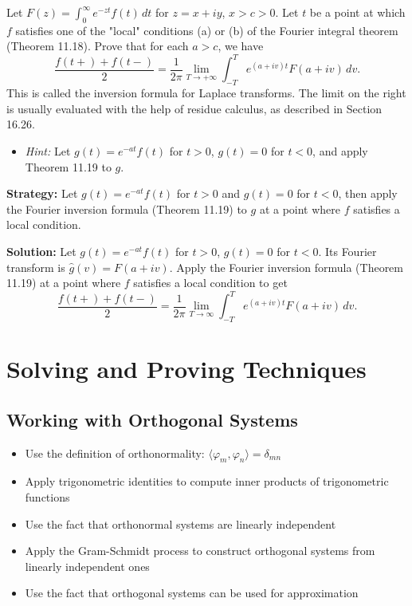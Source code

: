 \begin{problembox}
Let $F(z) = \int_0^\infty e^{-zt} f(t) \, dt$ for $z = x + iy$, $x > c > 0$. Let $t$ be a point at which $f$ satisfies one of the "local" conditions (a) or (b) of the Fourier integral theorem (Theorem 11.18). Prove that for each $a > c$, we have
\[
\frac{f(t+) + f(t-)}{2} = \frac{1}{2\pi} \lim_{T \to +\infty} \int_{-T}^T e^{(a + iv)t} F(a + iv) \, dv.
\]
This is called the inversion formula for Laplace transforms. The limit on the right is usually evaluated with the help of residue calculus, as described in Section 16.26.
\begin{itemize}
\item \textit{Hint:} Let $g(t) = e^{-at} f(t)$ for $t > 0$, $g(t) = 0$ for $t < 0$, and apply Theorem 11.19 to $g$.
\end{itemize}
\end{problembox}

\noindent\textbf{Strategy:} Let $g(t)=e^{-at}f(t)$ for $t>0$ and $g(t)=0$ for $t<0$, then apply the Fourier inversion formula (Theorem 11.19) to $g$ at a point where $f$ satisfies a local condition.

\bigskip\noindent\textbf{Solution:}
Let $g(t)=e^{-at}f(t)$ for $t>0$, $g(t)=0$ for $t<0$. Its Fourier transform is $\widehat g(v)=F(a+iv)$. Apply the Fourier inversion formula (Theorem 11.19) at a point where $f$ satisfies a local condition to get
\[\frac{f(t+)+f(t-)}{2}=\frac{1}{2\pi}\lim_{T\to\infty}\int_{-T}^T e^{(a+iv)t}F(a+iv)\,dv.\]

\section{Solving and Proving Techniques}

\subsection*{Working with Orthogonal Systems}
\begin{itemize}
\item Use the definition of orthonormality: $\langle \varphi_m, \varphi_n \rangle = \delta_{mn}$
\item Apply trigonometric identities to compute inner products of trigonometric functions
\item Use the fact that orthonormal systems are linearly independent
\item Apply the Gram-Schmidt process to construct orthogonal systems from linearly independent ones
\item Use the fact that orthogonal systems can be used for approximation
\end{itemize}

